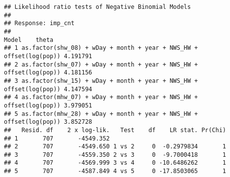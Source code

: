 \documentclass[
]{article}
\begin{document}
\begin{verbatim}
## Likelihood ratio tests of Negative Binomial Models
## 
## Response: imp_cnt
##                                                                 Model    theta
## 1 as.factor(shw_08) + wDay + month + year + NWS_HW + offset(log(pop)) 4.191791
## 2 as.factor(shw_07) + wDay + month + year + NWS_HW + offset(log(pop)) 4.181156
## 3 as.factor(shw_15) + wDay + month + year + NWS_HW + offset(log(pop)) 4.147594
## 4 as.factor(mhw_07) + wDay + month + year + NWS_HW + offset(log(pop)) 3.979051
## 5 as.factor(mhw_28) + wDay + month + year + NWS_HW + offset(log(pop)) 3.852728
##   Resid. df    2 x log-lik.   Test    df    LR stat. Pr(Chi)
## 1       707       -4549.352                                 
## 2       707       -4549.650 1 vs 2     0  -0.2979834       1
## 3       707       -4559.350 2 vs 3     0  -9.7000418       1
## 4       707       -4569.999 3 vs 4     0 -10.6486262       1
## 5       707       -4587.849 4 vs 5     0 -17.8503065       1
\end{verbatim}
\end{document}
